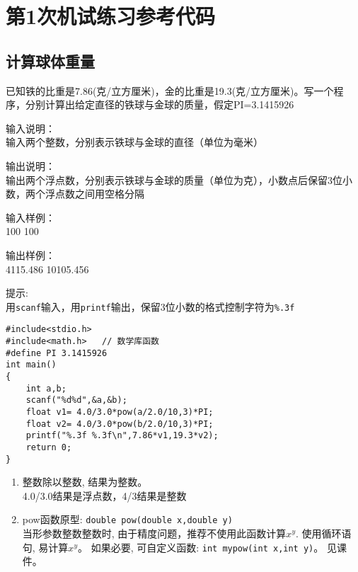 %
%
%
\chapter{第1次机试练习参考代码}

\section{计算球体重量}
已知铁的比重是7.86(克/立方厘米)，金的比重是19.3(克/立方厘米)。写一个程序，分别计算出给定直径的铁球与金球的质量，假定PI=3.1415926

输入说明：\\
输入两个整数，分别表示铁球与金球的直径（单位为毫米）

输出说明：\\
输出两个浮点数，分别表示铁球与金球的质量（单位为克），小数点后保留3位小数，两个浮点数之间用空格分隔

输入样例：\\
100 100

输出样例：\\
4115.486  10105.456

提示: \\
用\lstinline|scanf|输入，用\lstinline|printf|输出，保留3位小数的格式控制字符为\lstinline|%.3f|

\begin{lstlisting}
#include<stdio.h>
#include<math.h>   // 数学库函数 
#define PI 3.1415926       
int main()                   
{  
	int a,b;
	scanf("%d%d",&a,&b);
	float v1= 4.0/3.0*pow(a/2.0/10,3)*PI;
	float v2= 4.0/3.0*pow(b/2.0/10,3)*PI;
	printf("%.3f %.3f\n",7.86*v1,19.3*v2); 
	return 0;           
}                   
\end{lstlisting}

\begin{note}[要点]
	\begin{enumerate}
		\item 整数除以整数, 结果为整数。\\
		4.0/3.0结果是浮点数，4/3结果是整数
		\item pow函数原型: \lstinline|double pow(double x,double y)|\\
		当形参数整数整数时, 由于精度问题，推荐不使用此函数计算$x^y$. 使用循环语句, 易计算$x^y$。 如果必要, 可自定义函数: \lstinline|int mypow(int x,int y)|。 见课件。
	\end{enumerate}
\end{note}

